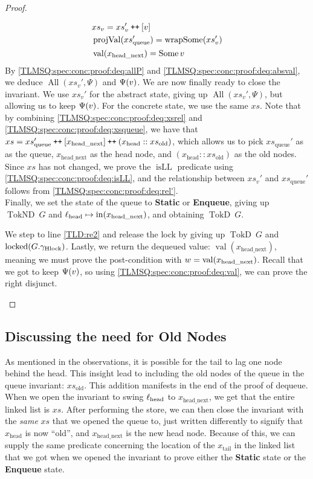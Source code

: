 \documentclass[a4paper, 10pt]{report}
\theoremstyle{definition}
\newcommand{\locked}{\operatorname{locked}}
\newcommand{\xsc}{xs}
\newcommand{\xsqueue}{xs_{\mathrm{queue}}}
\newcommand{\xsold}{xs_{\mathrm{old}}}
\newcommand{\isLL}{\operatorname{isLL}}
\newcommand{\AllP}{\operatorname{All}}
\newcommand{\projval}{\operatorname{projVal}}
\newcommand{\wrapsome}{\operatorname{wrapSome}}
\newcommand{\locN}[1]{\loc_{\mathrm{#1}}}
\newcommand{\lochead}{\locN{head}}
\newcommand{\nodeval}{\valB}
\newcommand{\nIn}[1]{\operatorname{in}(#1)}
\newcommand{\nVal}[1]{\operatorname{val}(#1)}
\newcommand{\node}{x}
\newcommand{\nodeN}[1]{\node_{\mathrm{#1}}}
\newcommand{\nodehead}{\nodeN{head}}
\newcommand{\nodetail}{\nodeN{tail}}
\newcommand{\nodeheadnext}{\nodeN{head\_next}}
\newcommand{\absvalue}{\val}
\newcommand{\absvalueList}{xs_v}
\newcommand{\StaticState}{\textbf{Static}\xspace}
\newcommand{\EnqueueState}{\textbf{Enqueue}\xspace}
\newcommand{\Qg}{G}
\newcommand{\ghlock}{\gname_{\mathrm{Hlock}}}
\newcommand{\TokD}[1]{\operatorname{TokD} ~ #1}
\newcommand{\TokDQg}{\TokD{\Qg}}
\newcommand{\TokND}[1]{\operatorname{TokND} ~ #1}
\newcommand{\TokNDQg}{\TokND{\Qg}}
\newcommand\catenate{\mathbin{\text{\ttfamily\upshape ++}}}
\begin{document}
\begin{proof}
\begin{itemize}
  \begin{align}
    &\absvalueList = \absvalueList' \catenate [\absvalue]\label{TLMSQ:spec:conc:proof:deq:absval}\\
    &\projval(\xsqueue') = \wrapsome(\absvalueList')\label{TLMSQ:spec:conc:proof:deq:rel'}\\
    &\nVal{\nodeheadnext} = \Some{\absvalue}\label{TLMSQ:spec:conc:proof:deq:val}
  \end{align}
  By \ref{TLMSQ:spec:conc:proof:deq:allP} and \ref{TLMSQ:spec:conc:proof:deq:absval}, we deduce $\AllP(\absvalueList', \Psi)$ and $\Psi(\absvalue)$. We are now finally ready to close the invariant. We use $\absvalueList'$ for the abstract state, giving up $\AllP(\absvalueList', \Psi)$, but allowing us to keep $\Psi(\absvalue)$. For the concrete state, we use the same $\xsc$. Note that by combining \ref{TLMSQ:spec:conc:proof:deq:xsrel} and \ref{TLMSQ:spec:conc:proof:deq:xsqueue}, we have that $\xsc = \xsqueue' \catenate [\nodeheadnext] \catenate (\nodehead :: \xsold)$, which allows us to pick $\xsqueue'$ as as the queue, $\nodeheadnext$ as the head node, and $(\nodehead :: \xsold)$ as the old nodes. Since $\xsc$ has not changed, we prove the $\isLL$ predicate using \ref{TLMSQ:spec:conc:proof:deq:isLL}, and the relationship between $\absvalueList'$ and $\xsqueue'$ follows from \ref{TLMSQ:spec:conc:proof:deq:rel'}.\\
  Finally, we set the state of the queue to \StaticState or \EnqueueState, giving up $\TokNDQg$ and $\lochead \mapsto \nIn{\nodeheadnext}$, and obtaining $\TokDQg$.

  We step to line \ref{TLD:re2} and release the lock by giving up $\TokDQg$ and $\locked(\Qg.\ghlock)$. Lastly, we return the dequeued value: $\nVal{\nodeheadnext}$, meaning we must prove the post-condition with $\nodeval = \nVal{\nodeheadnext}$. Recall that we got to keep $\Psi(\absvalue)$, so using \ref{TLMSQ:spec:conc:proof:deq:val}, we can prove the right disjunct.
\end{itemize}
\end{proof}

\subsection{Discussing the need for Old Nodes}\label{TLMSQ:Discussion:xs_old}

As mentioned in the observations, it is possible for the tail to lag one node behind the head. This insight lead to including the old nodes of the queue in the queue invariant: $\xsold$. This addition manifests in the end of the proof of dequeue. When we open the invariant to swing $\lochead$ to $\nodeheadnext$, we get that the entire linked list is $\xsc$. After performing the store, we can then close the invariant with the \emph{same} $\xsc$ that we opened the queue to, just written differently to signify that $\nodehead$ is now ``old'', and $\nodeheadnext$ is the new head node. Because of this, we can supply the same predicate concerning the location of the $\nodetail$ in the linked list that we got when we opened the invariant to prove either the \StaticState state or the \EnqueueState state.
\end{document}

